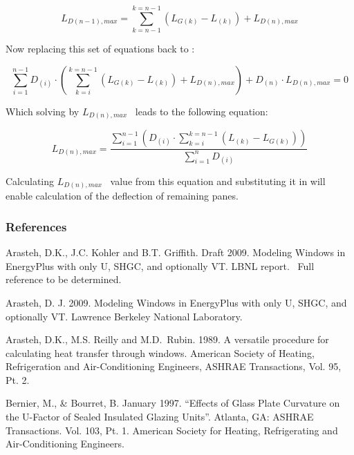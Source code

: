 \begin{equation}
{L_{D\left( {n - 1} \right),max}} = \mathop \sum \limits_{k = n - 1}^{k = n - 1} \left( {{L_{G\left( k \right)}} - {L_{\left( k \right)}}} \right) + {L_{D\left( n \right),max}}
\end{equation}

Now replacing this set of equations back to :

\begin{equation}
\mathop \sum \limits_{i = 1}^{n - 1} {D_{\left( i \right)}}\cdot \left( {\mathop \sum \limits_{k = i}^{k = n - 1} \left( {{L_{G\left( k \right)}} - {L_{\left( k \right)}}} \right) + {L_{D\left( n \right),max}}} \right) + {D_{\left( n \right)}}\cdot {L_{D\left( n \right),max}} = 0
\end{equation}

Which solving by \({L_{D\left( n \right),max}}\) ~leads to the following equation:

\begin{equation}
{L_{D\left( n \right),max}} = \frac{{\mathop \sum \nolimits_{i = 1}^{n - 1} ({D_{\left( i \right)}}\cdot \mathop \sum \nolimits_{k = i}^{k = n - 1} \left( {{L_{\left( k \right)}} - {L_{G\left( k \right)}}} \right))}}{{\mathop \sum \nolimits_{i = 1}^n {D_{\left( i \right)}}}}
\end{equation}

Calculating \({L_{D\left( n \right),max}}\) ~value from this equation and substituting it in will enable calculation of the deflection of remaining panes.

\subsubsection{References}\label{references-1-019}

Arasteh, D.K., J.C. Kohler and B.T. Griffith. Draft 2009. Modeling Windows in EnergyPlus with only U, SHGC, and optionally VT. LBNL report.~ Full reference to be determined.

Arasteh, D. J. 2009. Modeling Windows in EnergyPlus with only U, SHGC, and optionally VT. Lawrence Berkeley National Laboratory.

Arasteh, D.K., M.S. Reilly and M.D.~Rubin. 1989. A versatile procedure for calculating heat transfer through windows. American Society of Heating, Refrigeration and Air-Conditioning Engineers, ASHRAE Transactions, Vol. 95, Pt. 2.

Bernier, M., \& Bourret, B. January 1997. ``Effects of Glass Plate Curvature on the U-Factor of Sealed Insulated Glazing Units''. Atlanta, GA: ASHRAE Transactions. Vol. 103, Pt. 1. American Society for Heating, Refrigerating and Air-Conditioning Engineers.

